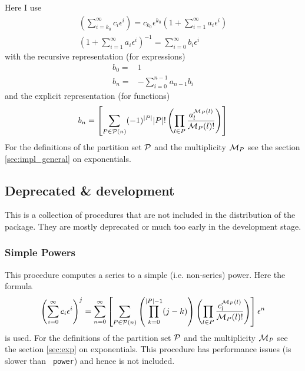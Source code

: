 \documentclass{article}
\begin{document}
Here I use
\begin{align}
  \label{eq:inv}
  \left(\sum_{i=k_0}^{\infty}c_i
    \epsilon^i\right)=c_{k_0}\epsilon^{k_0}\left(1+\sum_{i=1}^{\infty}a_i
    \epsilon^i\right)\\
\left(1+\sum_{i=1}^{\infty}a_i \epsilon^i\right)^{-1}=\sum_{i=0}^{\infty}b_i \epsilon^i
\end{align}
with the recursive representation (for expressions)
\begin{align}
  \label{eq:inv_rec}
  b_0=&1\\
  b_n=&-\sum_{i=0}^{n-1} a_{n-1}b_i 
\end{align}
and the explicit representation (for functions)
\begin{equation}
  \label{eq:inv_expl}
  b_n=\left[\sum_{P \in {\cal P}(n)} (-1)^{|P|}|P|!\left(\prod_{l \in P} \frac{a^{{\cal M}_P(l)}_l}{{\cal M}_P(l)!} \right)\right]
\end{equation}
For the definitions of the partition set ${\cal P}$ and the
multiplicity ${\cal M}_P$ see the section \ref{sec:impl_general} on
exponentials.

\subsection{Deprecated \& development}
\label{sec:depr}

This is a collection of procedures that are not included in the
distribution of the package. They are mostly deprecated or much too
early in the development stage.


\subsubsection{Simple Powers}
\label{sec:impl_simpl_pow}

This procedure computes a series to a simple
(i.e. non-series) power. Here the formula
\begin{equation}
  \label{eq:simpl_pow}
  \left(\sum_{i=0}^{\infty}c_i \epsilon^i\right)^j = \sum_{n=0}^\infty
  \left[\sum_{P \in {\cal P}(n)}\left(\prod_{k=0}^{|P|-1}
    (j-k)\right)\left(\prod_{l \in P} \frac{c^{{\cal M}_P(l)}_l}{{\cal M}_P(l)!} \right)\right]\epsilon^n
\end{equation}
is used. For the definitions of the partition set ${\cal P}$ and the
multiplicity ${\cal M}_P$ see the section \ref{sec:exp} on
exponentials. This procedure has performance issues (is slower than {\tt
  power}) and hence is not included.
\end{document}
